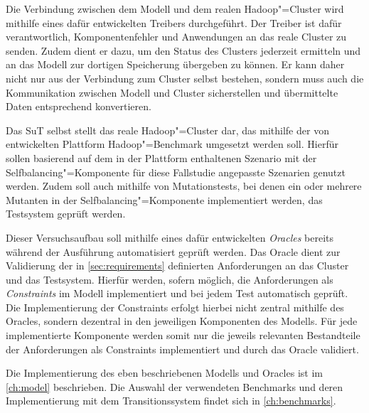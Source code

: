 Die Verbindung zwischen dem Modell und dem realen Hadoop"=Cluster wird mithilfe eines dafür entwickelten Treibers durchgeführt.
Der Treiber ist dafür verantwortlich, Komponentenfehler und Anwendungen an das reale Cluster zu senden.
Zudem dient er dazu, um den Status des Clusters jederzeit ermitteln und an das Modell zur dortigen Speicherung übergeben zu können.
Er kann daher nicht nur aus der Verbindung zum Cluster selbst bestehen, sondern muss auch die Kommunikation zwischen Modell und Cluster sicherstellen und übermittelte Daten entsprechend konvertieren.

Das \gls{SuT} selbst stellt das reale Hadoop"=Cluster dar, das mithilfe der von \citeauthor{Zhang2016} entwickelten Plattform Hadoop"=Benchmark umgesetzt werden soll.
Hierfür sollen basierend auf dem in der Plattform enthaltenen Szenario mit der Selfbalancing"=Komponente für diese Fallstudie angepasste Szenarien genutzt werden.
Zudem soll auch mithilfe von Mutationstests, bei denen ein oder mehrere Mutanten in der Selfbalancing"=Komponente implementiert werden, das Testsystem geprüft werden.

Dieser Versuchsaufbau soll mithilfe eines dafür entwickelten \emph{Oracles} bereits während der Ausführung automatisiert geprüft werden.
Das Oracle dient zur Validierung der in \cref{sec:requirements} definierten Anforderungen an das Cluster und das Testsystem.
Hierfür werden, sofern möglich, die Anforderungen als \emph{Constraints} im Modell implementiert und bei jedem Test automatisch geprüft.
Die Implementierung der Constraints erfolgt hierbei nicht zentral mithilfe des Oracles, sondern dezentral in den jeweiligen Komponenten des Modells.
Für jede implementierte Komponente werden somit nur die jeweils relevanten Bestandteile der Anforderungen als Constraints implementiert und durch das Oracle validiert.

Die Implementierung des eben beschriebenen Modells und Oracles ist im \cref{ch:model} beschrieben.
Die Auswahl der verwendeten Benchmarks und deren Implementierung mit dem Transitionssystem findet sich in \cref{ch:benchmarks}.
